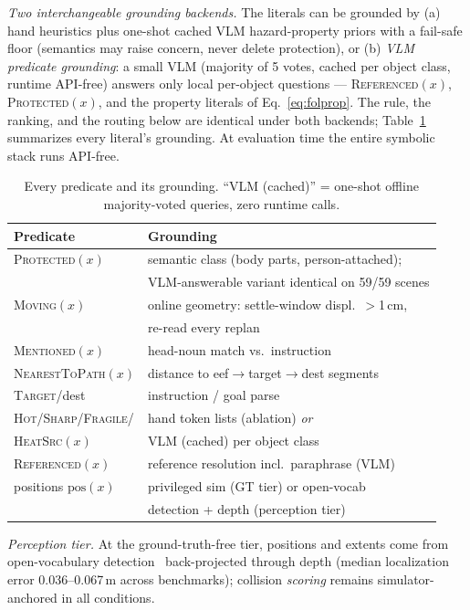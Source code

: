 \documentclass[conference]{IEEEtran}
\begin{document}
\emph{Two interchangeable grounding backends.} The literals can be grounded by (a) hand heuristics plus one-shot cached VLM hazard-property priors with a fail-safe floor (semantics may raise concern, never delete protection), or (b) \emph{VLM predicate grounding}: a small VLM (majority of 5 votes, cached per object class, runtime API-free) answers only local per-object questions --- \textsc{Referenced}$(x)$, \textsc{Protected}$(x)$, and the property literals of Eq.~\eqref{eq:folprop}. The rule, the ranking, and the routing below are identical under both backends; Table~\ref{tab:grounding} summarizes every literal's grounding. At evaluation time the entire symbolic stack runs API-free.

\begin{table}[t]
\centering
\caption{Every predicate and its grounding. ``VLM (cached)'' = one-shot offline majority-voted queries, zero runtime calls.}
\label{tab:grounding}
\small
\setlength{\tabcolsep}{4pt}
\begin{tabular}{ll}
\toprule
Predicate & Grounding \\
\midrule
\textsc{Protected}$(x)$ & semantic class (body parts, person-attached); \\
 & VLM-answerable variant identical on 59/59 scenes \\
\textsc{Moving}$(x)$ & online geometry: settle-window displ.\ $>$1\,cm, \\
 & re-read every replan \\
\textsc{Mentioned}$(x)$ & head-noun match vs.\ instruction \\
\textsc{NearestToPath}$(x)$ & distance to eef$\to$target$\to$dest segments \\
\textsc{Target}/dest & instruction / goal parse \\
\textsc{Hot/Sharp/Fragile/} & hand token lists (ablation) \emph{or} \\
\quad\textsc{HeatSrc}$(x)$ & VLM (cached) per object class \\
\textsc{Referenced}$(x)$ & reference resolution incl.\ paraphrase (VLM) \\
positions $\mathrm{pos}(x)$ & privileged sim (GT tier) or open-vocab \\
 & detection + depth (perception tier) \\
\bottomrule
\end{tabular}
\end{table}

\emph{Perception tier.} At the ground-truth-free tier, positions and extents come from open-vocabulary detection~\cite{gdino} back-projected through depth (median localization error 0.036--0.067\,m across benchmarks); collision \emph{scoring} remains simulator-anchored in all conditions.
\end{document}
